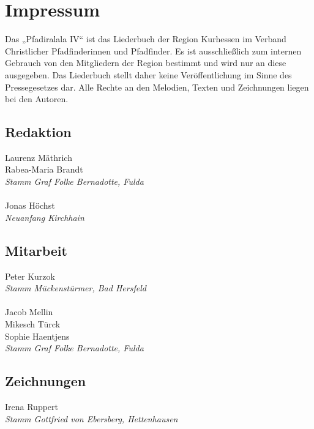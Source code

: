 \section*{Impressum}

\vspace{10pt} Das „Pfadiralala IV“ ist das Liederbuch der Region Kurhessen im Verband Christlicher Pfadfinderinnen und Pfadfinder. Es ist ausschließlich zum internen Gebrauch von den Mitgliedern der Region bestimmt und wird nur an diese ausgegeben. Das Liederbuch stellt daher keine Veröffentlichung im Sinne des Pressegesetzes dar. Alle Rechte an den Melodien, Texten und Zeichnungen liegen bei den Autoren. \\ \vspace{10pt} 

\begin{centering}
\begin{multicols}{2}

\subsection*{Redaktion}
Laurenz Mäthrich \\ Rabea-Maria Brandt \\ \textit{Stamm Graf Folke Bernadotte, Fulda} \\ ~\\
Jonas Höchst \\ \textit{Neuanfang Kirchhain} \\

\subsection*{Mitarbeit}
Peter Kurzok \\ \textit{Stamm Mückenstürmer, Bad Hersfeld} \\ ~\\
Jacob Mellin \\ Mikesch Türck \\ Sophie Haentjens \\ \textit{Stamm Graf Folke Bernadotte, Fulda} \\

\vfill\null
\columnbreak

\subsection*{Zeichnungen}
Irena Ruppert \\ \textit{Stamm Gottfried von Ebersberg, Hettenhausen} \\ ~\\


\end{multicols}
\end{centering}
